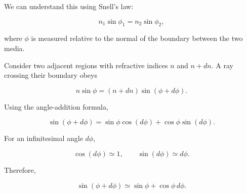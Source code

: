 We can understand this using Snell's law:

\begin{equation}
n_1\sin\phi_1=n_2\sin\phi_2,
\end{equation}

where $\phi$ is measured relative to the normal of
the boundary between the two media.

\begin{center}
\end{center}

Consider two adjacent regions with refractive indices
$n$ and $n+dn$. A ray crossing their boundary obeys

\begin{equation}
n\sin\phi=(n+dn)\sin(\phi+d\phi).
\end{equation}

Using the angle-addition formula,

\begin{equation}
\sin(\phi+d\phi)
=
\sin\phi\cos(d\phi)
+
\cos\phi\sin(d\phi).
\end{equation}

For an infinitesimal angle $d\phi$,

\begin{equation}
\cos(d\phi)\simeq 1,
\qquad
\sin(d\phi)\simeq d\phi.
\end{equation}

Therefore,

\begin{equation}
\sin(\phi+d\phi)
\simeq
\sin\phi+\cos\phi\,d\phi.
\end{equation}


